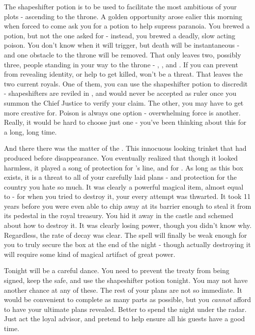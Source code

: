 \documentclass[char]{NeptuneBall}
\begin{document}
The shapeshifter potion is to be used to facilitate the most ambitious of your plots - ascending to the throne. A golden opportunity arose ealier this morning when \cKing{} forced \cPlant{} to come ask you for a potion to help supress paranoia. You brewed a potion, but not the one \cPlant{\they} asked for - instead, you brewed a deadly, slow acting poison. You don't know when it will trigger, but death will be instantaneous - and one obstacle to the throne will be removed. That only leaves two, possibly three, people standing in your way to the throne - \cKing{}, \cPrincess{}, and \cQueen{}. If you can prevent \cQueen{} from revealing \cQueen{\their} identity, or help to get \cQueen{\them} killed, \cQueen{\they} won't be a threat. That leaves the two current royals. One of them, you can use the shapeshifter potion to discredit - shapeshifters are reviled in \pAtlantis{}, and would never be accepted as ruler once you summon the Chief Justice to verify your claim. The other, you may have to get more creative for. Poison is always one option - overwhelming force is another. Really, it would be hard to choose just one - you've been thinking about this for a long, long time.

And there there was the matter of the \iMusicBox{\MYname}. This innocuous looking trinket that \cQueen{} had produced before \cQueen{\their} disappearance. You eventually realized that though it looked harmless, it played a song of protection for \cExExKing{}'s line, and for \pAtlantis{}. As long as this box exists, it is a threat to all of your carefully laid plans - and protection for the country you hate so much. It was clearly a powerful magical item, almost equal to \iTrident{\MYname} - for when you tried to destroy it, your every attempt was thwarted. It took 11 years before you were even able to chip away at its barrier enough to steal it from its pedestal in the royal treasury. You hid it away in the castle and schemed about how to destroy it. It was clearly losing power, though you didn't know why. Regardless, the rate of decay was clear. The spell will finally be weak enough for you to truly secure the box at the end of the night - though actually destroying it will require some kind of magical artifact of great power.

Tonight will be a careful dance. You need to prevent the treaty from being signed, keep the \iMusicBox{} safe, and use the shapeshifter potion tonight. You may not have another chance at any of these. The rest of your plans are not so immediate. It would be convenient to complete as many parts as possible, but you \emph{cannot} afford to have your ultimate plans revealed. Better to spend the night under the radar. Just act the loyal advisor, and pretend to help \cKing{} ensure all his guests have a good time.
\end{document}

